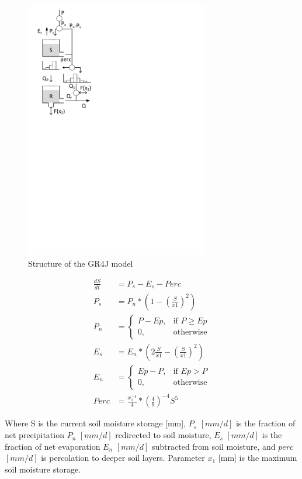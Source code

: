 { 																	%
\begin{figure}
\includegraphics[trim=1cm 17cm 7cm 1cm,width=8cm,keepaspectratio]{./AppA_files/07_schematic.pdf}
\caption{Structure of the GR4J model} \label{fig:07_schematic}
\end{figure}

\begin{align}
	\frac{dS}{dt} &= P_s-E_s-Perc \\
	P_s &= P_n* \left(1-\left(\frac{S}{x1}\right)^2\right)\\
	P_n &= 
	\begin{cases}
		P-Ep, & \text{if } P \geq Ep \\
		0, & \text{otherwise}
	\end{cases} \\
	E_s &= E_n*\left(2\frac{S}{x1}-\left(\frac{S}{x1}\right)^2\right)\\
	E_n &= 
	\begin{cases}
		Ep-P, & \text{if } Ep > P \\
		0, & \text{otherwise}
	\end{cases} \\
	Perc &= \frac{x_1^{-4}}{4}*\left(\frac{4}{9}\right)^{-4}S^5
\end{align}

Where S is the current soil moisture storage [mm], $P_s$ $[mm/d]$ is the fraction of net precipitation $P_n$ $[mm/d]$ redirected to soil moisture, $E_s$ $[mm/d]$ is the fraction of net evaporation $E_n$ $[mm/d]$ subtracted from soil moisture, and $perc$ $[mm/d]$ is percolation to deeper soil layers. Parameter $x_1$ [mm] is the maximum soil moisture storage.

} %

